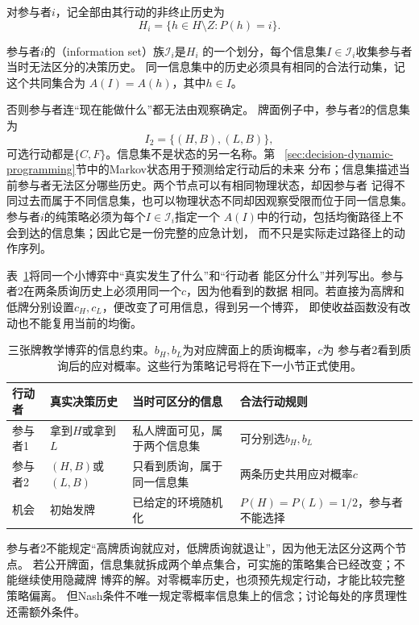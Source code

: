 对参与者\(i\)，记全部由其行动的非终止历史为
\[
  H_i=\{h\in H\setminus Z:P(h)=i\}.
\]
\begin{definition}[信息集]
\label{def:game-information-set}
参与者\(i\)的（information set）族\(\mathcal{I}_i\)是\(H_i\)
的一个划分，每个信息集\(I\in\mathcal{I}_i\)收集参与者当时无法区分的决策历史。
同一信息集中的历史必须具有相同的合法行动集，记这个共同集合为
\(A(I)=A(h)\)，其中\(h\in I\)。
\end{definition}
否则参与者连“现在能做什么”都无法由观察确定。
牌面例子中，参与者2的信息集为
\[
  I_2=\{(H,B),(L,B)\},
\]
可选行动都是\(\{C,F\}\)。信息集不是状态的另一名称。第
~\ref{sec:decision-dynamic-programming}节中的Markov状态用于预测给定行动后的未来
分布；信息集描述当前参与者无法区分哪些历史。两个节点可以有相同物理状态，却因参与者
记得不同过去而属于不同信息集，也可以物理状态不同却因观察受限而位于同一信息集。
参与者\(i\)的纯策略必须为每个\(I\in\mathcal{I}_i\)指定一个
\(A(I)\)中的行动，包括均衡路径上不会到达的信息集；因此它是一份完整的应急计划，
而不只是实际走过路径上的动作序列。

表~\ref{tab:game-card-information}将同一个小博弈中“真实发生了什么”和“行动者
能区分什么”并列写出。参与者2在两条质询历史上必须用同一个$c$，因为他看到的数据
相同。若直接为高牌和低牌分别设置$c_H,c_L$，便改变了可用信息，得到另一个博弈，
即使收益函数没有改动也不能复用当前的均衡。

\begin{table}[htbp]
  \centering
  \begin{tabularx}{\linewidth}{lXXX}
    \toprule
    行动者 & 真实决策历史 & 当时可区分的信息 & 合法行动规则\\
    \midrule
    参与者1 & 拿到$H$或拿到$L$ & 私人牌面可见，属于两个信息集 & 可分别选$b_H,b_L$\\
    参与者2 & $(H,B)$或$(L,B)$ & 只看到质询，属于同一信息集 & 两条历史共用应对概率$c$\\
    机会 & 初始发牌 & 已给定的环境随机化 & $P(H)=P(L)=1/2$，参与者不能选择\\
    \bottomrule
  \end{tabularx}
  \caption{三张牌教学博弈的信息约束。$b_H,b_L$为对应牌面上的质询概率，$c$为
  参与者2看到质询后的应对概率。这些行为策略记号将在下一小节正式使用。}
  \label{tab:game-card-information}
\end{table}

参与者2不能规定“高牌质询就应对，低牌质询就退让”，因为他无法区分这两个节点。
若公开牌面，信息集就拆成两个单点集合，可实施的策略集合已经改变；不能继续使用隐藏牌
博弈的解。对零概率历史，也须预先规定行动，才能比较完整策略偏离。
但Nash条件不唯一规定零概率信息集上的信念；讨论每处的序贯理性还需额外条件。


